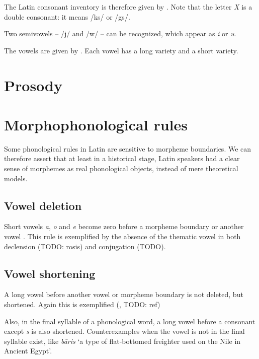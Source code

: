 \documentclass[a4paper, oneside, 12pt]{report}
\newcommand*{\citesec}[1]{\S~{#1}}
\newcommand*{\citetable}[1]{Table~{#1}}
\newcommand{\form}[1]{\emph{#1}}
\newcommand{\translate}[1]{`#1'}
\begin{document}
The Latin consonant inventory is therefore given by \citet[\citetable{3.1}]{oniga2014latin}.
Note that the letter \form{X} is a double consonant: 
it means /ks/ or /gs/.

Two semivowels -- /j/ and /w/ -- can be recognized,
which appear as \form{i} or \form{u}.

The vowels are given by \citet[\citetable{3.2}]{oniga2014latin}.
Each vowel has a long variety and a short variety.

\section{Prosody}



\section{Morphophonological rules}\label{sec:phonology.morphological}

Some phonological rules in Latin are sensitive to morpheme boundaries.
We can therefore assert that at least in a historical stage, 
Latin speakers had a clear sense of morphemes 
as real phonological objects,
instead of mere theoretical models.

\subsection{Vowel deletion}\label{sec:phonology.rule.deletion}

Short vowels \form{a}, \form{o} and \form{e} 
become zero before a morpheme boundary or another vowel
\citep[\citesec{8.3}]{oniga2014latin}.
This rule is exemplified by the absence 
of the thematic vowel in both declension (TODO: rosis)
and conjugation (TODO).

\subsection{Vowel shortening}\label{sec:phonology.rule.shortening}

A long vowel before another vowel or morpheme boundary 
is not deleted, but shortened.
Again this is exemplified (, TODO: ref)

Also, in the final syllable of a phonological word,
a long vowel before a consonant except \form{s} is also shortened.
Counterexamples when the vowel is not in the final syllable exist,
like \form{b\={a}ris} \translate{a type of flat-bottomed freighter used on the Nile in Ancient Egypt}.
\end{document}
